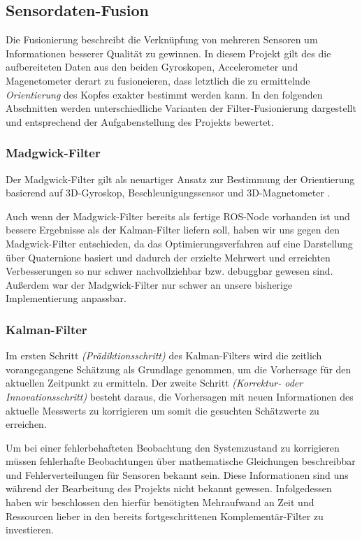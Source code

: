 
\subsection{Sensordaten-Fusion}
\label{headtracking_fusion_subsec}
Die Fusionierung beschreibt die Verknüpfung von mehreren Sensoren um Informationen besserer Qualität zu gewinnen. In diesem Projekt gilt des die aufbereiteten Daten aus den beiden Gyroskopen, Accelerometer und Magenetometer derart zu fusioneieren, dass letztlich die zu ermittelnde \emph{Orientierung} des Kopfes exakter bestimmt werden kann. In den folgenden Abschnitten werden unterschiedliche Varianten der Filter-Fusionierung dargestellt und entsprechend der Aufgabenstellung des Projekts bewertet. 


\subsubsection{Madgwick-Filter}

Der Madgwick-Filter gilt als neuartiger Ansatz zur Bestimmung der Orientierung basierend auf 3D-Gyroskop, Beschleunigungssensor und 3D-Magnetometer \cite{}.

Auch wenn der Madgwick-Filter bereits als fertige ROS-Node vorhanden ist und  bessere Ergebnisse als der Kalman-Filter liefern soll, haben wir uns gegen den Madgwick-Filter entschieden, da das Optimierungsverfahren auf eine Darstellung über Quaternione basiert und dadurch der erzielte Mehrwert und erreichten Verbesserungen so nur schwer nachvollziehbar bzw. debuggbar gewesen sind. Außerdem war der Madgwick-Filter nur schwer an unsere bisherige Implementierung anpassbar.

\subsubsection{Kalman-Filter}
Im ersten Schritt \emph{(Prädiktionsschritt)} des Kalman-Filters wird die zeitlich vorangegangene Schätzung als Grundlage genommen, um die Vorhersage für den aktuellen Zeitpunkt zu ermitteln. Der zweite Schritt \emph{(Korrektur- oder Innovationsschritt)} besteht daraus, die Vorhersagen mit neuen Informationen des aktuelle Messwerts zu korrigieren um somit die gesuchten Schätzwerte zu erreichen.

Um bei einer fehlerbehafteten Beobachtung den Systemzustand zu korrigieren müssen fehlerhafte Beobachtungen über mathematische Gleichungen beschreibbar und Fehlerverteilungen für Sensoren bekannt sein. Diese Informationen sind uns während der Bearbeitung des Projekts nicht bekannt gewesen. Infolgedessen haben wir beschlossen den hierfür benötigten Mehraufwand an Zeit und Ressourcen lieber in den bereits fortgeschrittenen Komplementär-Filter zu investieren.


